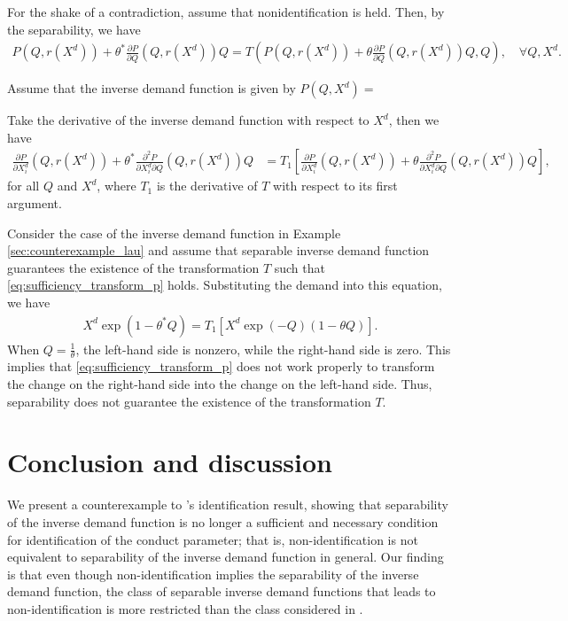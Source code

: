 \documentclass[11pt, a4paper]{article}
\theoremstyle{remark}
\begin{document}
For the shake of a contradiction, assume that nonidentification is held.
Then, by the separability, we have 
\begin{align}
    P(Q, r(X^{d})) + \theta^{*} \frac{\partial P}{\partial Q} (Q, r(X^{d})) Q = T\left(P(Q, r(X^{d})) + \theta \frac{\partial P}{\partial Q} (Q, r(X^{d})) Q, Q\right), \quad \forall Q, X^{d}.
\end{align}

Assume that the inverse demand function is given by $P(Q, X^{d}) = $




Take the derivative of the inverse demand function with respect to $X^{d}$, then we have
\begin{align}
    \frac{\partial P}{\partial X^{d}_i}(Q, r(X^{d})) + \theta^{*} \frac{\partial^2 P}{\partial X^{d}_i\partial Q}(Q, r(X^{d}))Q 
    &= T_1\left[\frac{\partial P}{\partial X^{d}_i}(Q, r(X^{d})) + \theta \frac{\partial^2 P}{\partial X^{d}_i\partial Q}(Q, r(X^{d}))Q\right],
\end{align}
for all $Q$ and $X^{d}$, where $T_1$ is the derivative of $T$ with respect to its first argument.

Consider the case of the inverse demand function in Example \ref{sec:counterexample_lau} and assume that separable inverse demand function guarantees the existence of the transformation $T$ such that \eqref{eq:sufficiency_transform_p} holds.
Substituting the demand into this equation, we have
\begin{align}
X^{d}\exp(1 -\theta^{*} Q) = T_1\left[X^{d}\exp(-Q)(1 - \theta Q)\right].
\end{align}
When $Q = \frac{1}{\theta}$, the left-hand side is nonzero, while the right-hand side is zero.
This implies that \eqref{eq:sufficiency_transform_p} does not work properly to transform the change on the right-hand side into the change on the left-hand side.
Thus, separability does not guarantee the existence of the transformation $T$.


\section{Conclusion and discussion}

We present a counterexample to \citet{lau1982identifying}'s identification result, showing that separability of the inverse demand function is no longer a sufficient and necessary condition for identification of the conduct parameter; that is, non-identification is not equivalent to separability of the inverse demand function in general.
Our finding is that even though non-identification implies the separability of the inverse demand function, the class of separable inverse demand functions that leads to non-identification is more restricted than the class considered in \citet{lau1982identifying}.
\end{document}
